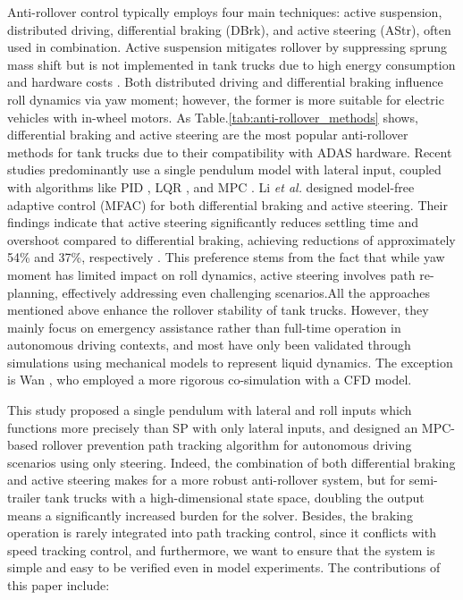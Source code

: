 Anti-rollover control typically employs four main techniques: active suspension, distributed driving, differential braking (DBrk), and active steering (AStr), often used in combination. Active suspension mitigates rollover by suppressing sprung mass shift but is not implemented in tank trucks due to high energy consumption and hardware costs \cite{ActiveSus_Engery}. Both distributed driving and differential braking influence roll dynamics via yaw moment; however, the former is more suitable for electric vehicles with in-wheel motors. 
As Table.\ref{tab:anti-rollover_methods} shows, differential braking and active steering are the most popular anti-rollover methods for tank trucks due to their compatibility with ADAS hardware. Recent studies predominantly use a single pendulum model with lateral input, coupled with algorithms like PID \cite{ZhaoWeiqiang2018, Lijie2020}, LQR \cite{Reviewer2_SunWencai2022, ZhaoWeiqiang2019, Yuzhixin2019}, and MPC \cite{Yuzhixin2018, WanYing2018}.
Li \textit{et al.} designed model-free adaptive control (MFAC) for both differential braking and active steering. Their findings indicate that active steering significantly reduces settling time and overshoot compared to differential braking, achieving reductions of approximately 54\% and 37\%, respectively \cite{MFAC_LiXiansheng2021}. This preference stems from the fact that while yaw moment has limited impact on roll dynamics, active steering involves path re-planning, effectively addressing even challenging scenarios.All the approaches mentioned above enhance the rollover stability of tank trucks. However, they mainly focus on emergency assistance rather than full-time operation in autonomous driving contexts, and most have only been validated through simulations using mechanical models to represent liquid dynamics. The exception is Wan \cite{WanYing2018}, who employed a more rigorous co-simulation with a CFD model. 

This study proposed a single pendulum with lateral and roll inputs which functions more precisely than SP with only lateral inputs, and designed an MPC-based rollover prevention path tracking algorithm for autonomous driving scenarios using only steering. Indeed, the combination of both differential braking and active steering makes for a more robust anti-rollover system, but for semi-trailer tank trucks with a high-dimensional state space, doubling the output means a significantly increased burden for the solver. Besides, the braking operation is rarely integrated into path tracking control, since it conflicts with speed tracking control, and furthermore, we want to ensure that the system is simple and easy to be verified even in model experiments. The contributions of this paper include:

